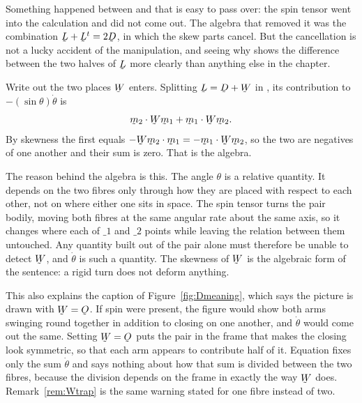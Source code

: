 \begin{remark}\label{rem:Wdrops}
Something happened between  and  that is easy to pass
over: the spin tensor went into the calculation and did not come out. The
algebra that removed it was the combination $\bL+\bL^{t}=2\bD$, in which
the skew parts cancel. But the cancellation is not a lucky accident of the
manipulation, and seeing why shows the difference between the two halves
of $\bL$ more clearly than anything else in the chapter.

Write out the two places $\bW$ enters. Splitting $\bL=\bD+\bW$ in
, its contribution to $-(\sin\theta)\dot\theta$ is
\[
   \ip{\bm_{2}}{\bW\bm_{1}}+\ip{\bm_{1}}{\bW\bm_{2}} .
\]
By skewness the first equals $-\ip{\bW\bm_{2}}{\bm_{1}}
=-\ip{\bm_{1}}{\bW\bm_{2}}$, so the two are negatives of one another and
their sum is zero. That is the algebra.

The reason behind the algebra is this. The angle $\theta$ is a relative
quantity. It depends on the two fibres only through how they are placed
with respect to each other, not on where either one sits in space. The
spin tensor turns the pair bodily, moving both fibres at the same angular
rate about the same axis, so it changes where each of $\bm_{1}$ and
$\bm_{2}$ points while leaving the relation between them untouched. Any
quantity built out of the pair alone must therefore be unable to detect
$\bW$, and $\dot\theta$ is such a quantity. The skewness of $\bW$ is the
algebraic form of the sentence: a rigid turn does not deform anything.

This also explains the caption of Figure~\ref{fig:Dmeaning}, which says
the picture is drawn with $\bW=\Ob$. If spin were present, the figure
would show both arms swinging round together in addition to closing on one
another, and $\dot\theta$ would come out the same. Setting $\bW=\Ob$ puts
the pair in the frame that makes the closing look symmetric, so that each
arm appears to contribute half of it. Equation  fixes only the
sum $\dot\theta$ and says nothing about how that sum is divided between
the two fibres, because the division depends on the frame in exactly the
way $\bW$ does. Remark~\ref{rem:Wtrap} is the same warning stated for one
fibre instead of two.
\end{remark}


